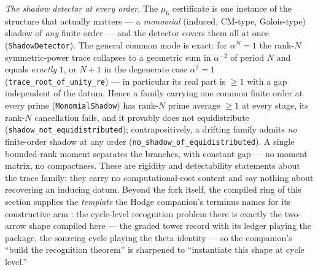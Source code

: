 \documentclass[11pt]{article}
\theoremstyle{definition}
\begin{document}
\emph{The shadow detector at every order.}  The $\mu_6$ certificate is one
instance of the structure that actually matters --- a \emph{monomial} (induced,
CM-type, Galois-type) shadow of \emph{any} finite order --- and the detector
covers them all at once (\texttt{ShadowDetector}).  The general common mode is
exact: for $\alpha^N=1$ the rank-$N$ symmetric-power trace collapses to a
geometric sum in $\alpha^{-2}$ of period $N$ and equals
\emph{exactly} $1$, or $N+1$ in the degenerate case $\alpha^2=1$
(\texttt{trace\_root\_of\_unity\_re}) --- in particular its real part is $\ge 1$
with a gap independent of the datum.  Hence a family carrying one common finite
order at every prime (\texttt{MonomialShadow}) has rank-$N$ prime average $\ge 1$
at every stage, its rank-$N$ cancellation fails, and it provably does not
equidistribute (\texttt{shadow\_not\_equidistributed}); contrapositively, a
drifting family admits \emph{no} finite-order shadow at any order
(\texttt{no\_shadow\_of\_equidistributed}).  A single bounded-rank moment
separates the branches, with constant gap --- no moment matrix, no compactness.
These are rigidity and detectability statements about the trace family; they
carry no computational-cost content and say nothing about recovering an inducing
datum.  Beyond the fork itself, the compiled ring of this section supplies the
\emph{template} the Hodge companion's terminus names for its constructive arm
\cite{HodgeCompanion}: the cycle-level recognition problem there is exactly the
two-arrow shape compiled here --- the graded tower record with its ledger
playing the package, the sourcing cycle playing the theta identity --- so the
companion's ``build the recognition theorem'' is sharpened to ``instantiate
this shape at cycle level.''
\end{document}
